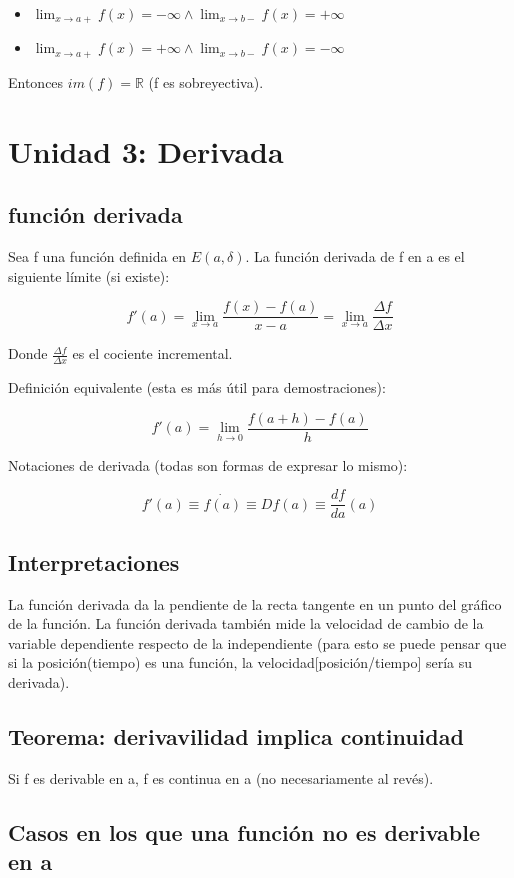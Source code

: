 \documentclass{report}
\begin{document}
		\begin{itemize}
			\item $\lim_{x \to a+} f(x)=-\infty \wedge \lim_{x \to b-}f(x)=+\infty$
			\item $\lim_{x \to a+} {f(x)}=+\infty \wedge \lim_{x \to b-}f(x)=-\infty$
		\end{itemize}
		
		Entonces $im(f)=\mathbb{R}$ (f es sobreyectiva).

\chapter{Unidad 3: Derivada}
	\section{función derivada}
		Sea f una función definida en $E(a, \delta)$. La función derivada de f en a es el siguiente límite (si existe):
		
		$$f'(a) = \lim_{x \to a}\frac{f(x)-f(a)}{x-a} = \lim_{x \to a}\frac{\Delta f}{\Delta x}$$
		
		Donde $\frac{\Delta f}{\Delta x}$ es el cociente incremental.
		
		Definición equivalente (esta es más útil para demostraciones):
		
		$$f'(a) = \lim_{h \to 0}\frac{f(a+h)-f(a)}{h}$$
		
		Notaciones de derivada (todas son formas de expresar lo mismo):
		
		$$f'(a) \equiv \dot{f(a)} \equiv Df(a) \equiv \frac{df}{da}(a)$$
		
	\section{Interpretaciones}
		La función derivada da la pendiente de la recta tangente en un punto del gráfico de la función. La función derivada también mide la velocidad de cambio de la variable dependiente respecto de la independiente (para esto se puede pensar que si la posición(tiempo) es una función, la velocidad[posición/tiempo] sería su derivada).
		
	\section{Teorema: derivavilidad implica continuidad}
		Si f es derivable en a, f es continua en a (no necesariamente al revés).
		
	\section{Casos en los que una función no es derivable en a}
	
\end{document}
